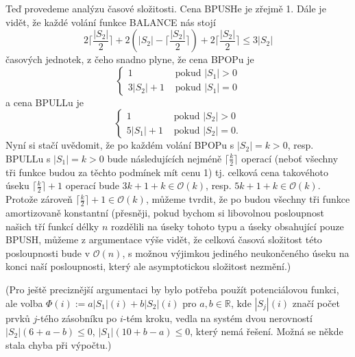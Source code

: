 \documentclass[12pt,a4paper]{article}
\theoremstyle{plain}
\begin{document}
\begin{enumerate}[a)]
Teď provedeme analýzu časové složitosti. Cena BPUSHe je zřejmě 1. Dále je vidět, že každé volání funkce BALANCE nás stojí $$2\lceil\frac{|S_2|}{2}\rceil+2(|S_2|-\lceil\frac{|S_2|}{2}\rceil)+2\lceil\frac{|S_2|}{2}\rceil\leq 3|S_2|$$
časových jednotek, z čeho snadno plyne, že cena BPOPu je
$$\begin{cases}
1& \text{ pokud } |S_1|>0\\
3|S_2|+1& \text{ pokud } |S_1|=0
\end{cases}$$
a  cena BPULLu je
$$\begin{cases}
1& \text{ pokud } |S_2|>0\\
5|S_1|+1& \text{ pokud } |S_2|=0.
\end{cases}$$
Nyní si stačí uvědomit, že po každém  volání BPOPu s $|S_2|=k>0$, resp. BPULLu s $|S_1|=k>0$ bude následujících nejméně $\lceil \frac{k}{2}\rceil$ operací  (neboť všechny tři funkce budou za těchto podmínek mít cenu 1) tj. celková cena takovéhoto úseku $\lceil \frac{k}{2}\rceil+1$ operací bude $3k+1+k\in\mathcal{O}(k)$, resp. $5k+1+k\in\mathcal{O}(k)$. Protože zároveň $\lceil \frac{k}{2}\rceil+1\in \mathcal{O}(k)$, můžeme tvrdit, že po  budou všechny tři funkce amortizovaně konstantní (přesněji, pokud bychom si libovolnou posloupnost našich tří funkcí délky $n$ rozdělili na úseky tohoto typu a úseky obsahující pouze BPUSH, můžeme z argumentace výše vidět, že celková časová složitost této posloupnosti bude v $\mathcal{O}(n)$, s možnou výjimkou jediného neukončeného úseku na konci naší posloupnosti, který ale asymptotickou složitost nezmění.)

(Pro ještě preciznější argumentaci by bylo potřeba použít potenciálovou funkci, ale volba $\Phi(i):=a|S_1|(i)+b|S_2|(i)$ pro $a,b\in\mathbb{R}$, kde $|S_j|(i)$ značí počet prvků $j$-tého zásobníku po $i$-tém kroku, vedla na systém dvou nerovností $|S_2|(6+a-b)\leq 0$, $|S_1|(10+b-a)\leq 0$, který nemá řešení. Možná se někde stala chyba při výpočtu.)
\end{enumerate}
\end{document}
